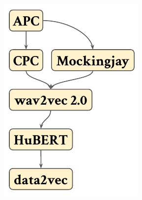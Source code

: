 \begin{frame}
    \frametitle{\vphantom{ABCDEFGHJIJKLMNOPQRSTVWXYZ}{Development of SSL for speech}}
    \begin{columns}[t]
        \hspace{0.025\textwidth}
        \begin{column}{0.20\textwidth}
            \begin{figure}[\textwidth]
                \centering
                \includegraphics[width=\textwidth]{figures/brief-flow-0.pdf}
            \end{figure}
        \end{column}
        {\textcolor{black!40}{\vrule{}}}
        \begin{column}{0.40\textwidth}
            {\vspace{0.10\textheight}\footnotesize
            \begin{itemize}

\end{itemize}}
\end{column}
\end{columns}
\end{frame}
